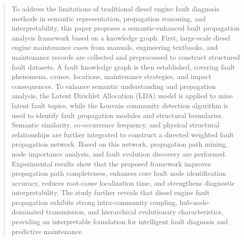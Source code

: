 \documentclass[conference]{IEEEconf}
\begin{document}
\maketitle
\begin{abstract}
To address the limitations of traditional diesel engine fault diagnosis methods in semantic representation, propagation reasoning, and interpretability, this paper proposes a semantic-enhanced fault propagation analysis framework based on a knowledge graph. First, large-scale diesel engine maintenance cases from manuals, engineering textbooks, and maintenance records are collected and preprocessed to construct structured fault datasets. A fault knowledge graph is then established, covering fault phenomena, causes, locations, maintenance strategies, and impact consequences.
To enhance semantic understanding and propagation analysis, the Latent Dirichlet Allocation (LDA) model is applied to mine latent fault topics, while the Louvain community detection algorithm is used to identify fault propagation modules and structural boundaries. Semantic similarity, co-occurrence frequency, and physical structural relationships are further integrated to construct a directed weighted fault propagation network. Based on this network, propagation path mining, node importance analysis, and fault evolution discovery are performed.
Experimental results show that the proposed framework improves propagation path completeness, enhances core fault node identification accuracy, reduces root-cause localization time, and strengthens diagnostic interpretability. The study further reveals that diesel engine fault propagation exhibits strong intra-community coupling, hub-node-dominated transmission, and hierarchical evolutionary characteristics, providing an interpretable foundation for intelligent fault diagnosis and predictive maintenance.
\end{abstract}
\end{document}
